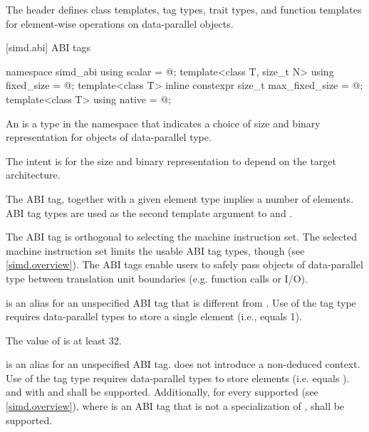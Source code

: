 \pnum
The header  defines class templates, tag types, trait types, and function templates for element-wise operations on data-parallel objects.

[simd.abi]{ ABI tags}

\begin{codeblock}
namespace simd_abi {
  using scalar = @\seebelow@;
  template<class T, size_t N> using fixed_size = @\seebelow@;
  template<class T> inline constexpr size_t max_fixed_size = @\impdef@;
  template<class T> using native = @\impdef@;
}
\end{codeblock}

\pnum
An  is a type in the  namespace that indicates a choice of size and binary representation for objects of data-parallel type. \begin{note}The intent is for the size and binary representation to depend on the target architecture.\end{note} The ABI tag, together with a given element type implies a number of elements. ABI tag types are used as the second template argument to  and .

\pnum
\begin{note}The ABI tag is orthogonal to selecting the machine instruction set. The selected machine instruction set limits the usable ABI tag types, though (see \ref{simd.overview}). The ABI tags enable users to safely pass objects of data-parallel type between translation unit boundaries (e.g. function calls or I/O).\end{note}

\pnum
{} is an alias for an unspecified ABI tag that is different from .
Use of the  tag type requires data-parallel types to store a single element (i.e.,  equals 1).

\pnum
The value of  is at least 32.

\pnum
{} is an alias for an unspecified ABI tag.
 does not introduce a non-deduced context.
Use of the  tag type requires data-parallel types to store 
elements (i.e.  equals
).  and  with  and  shall be supported.
Additionally, for every supported  (see \ref{simd.overview}), where 
is an ABI tag that is not a specialization of ,  shall be supported.

